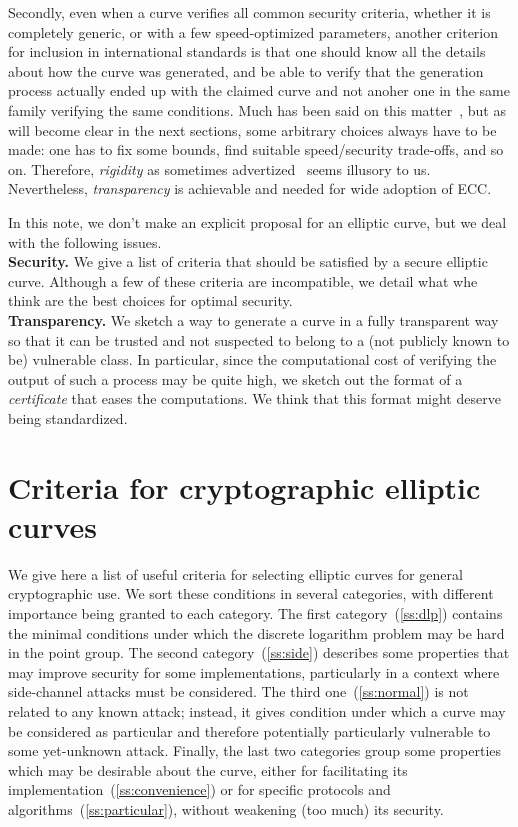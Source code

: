 \documentclass[twocolumn,letterpaper,10pt]{article}
\begin{document}
\medskip
Secondly, even when a curve verifies all common security criteria,
whether it is completely generic, or with a few speed-optimized parameters,
another criterion for inclusion in international standards is that
one should know all the details about how the curve was generated,
and be able to verify that the
generation process actually ended up with the claimed curve
and not anoher one in the same family verifying the same conditions.
Much has been said on this matter~\cite{safecurves,msr2014bcln,eprint2014brainpool,eprint2013abgr},
but as will become clear in the next sections, some arbitrary choices always have
to be made: one has to fix some bounds,
find suitable speed/security trade-offs, and so on.
Therefore, \emph{rigidity} as sometimes advertized~\cite{safecurves} seems illusory
to us.
Nevertheless, \emph{transparency} is achievable and needed for wide adoption of ECC.

\medskip

In this note, we don't make an explicit proposal for an elliptic curve,
but we deal with the following issues.
\\{\bf Security. }
We give a list of criteria that should be satisfied by
a secure elliptic curve.
Although a few of these criteria are incompatible,
we detail what whe think are the best choices for optimal security.
\\{\bf Transparency. }
We sketch a way to generate a curve in a fully transparent way
so that it can be trusted and not suspected to
belong to a (not publicly known to be) vulnerable class.
In particular, since the computational cost of verifying
the output of such a process may be quite high,
we sketch out the format of a \emph{certificate} that eases the computations.
We think that this format might deserve being standardized.

\section{Criteria for cryptographic elliptic curves}
\label{s:criteria}
We give here a list of useful criteria for selecting elliptic curves
for general cryptographic use.
We sort these conditions in several categories,
with different importance being granted to each category.
The first category~(\ref{ss:dlp}) contains the minimal conditions under which
the discrete logarithm problem may be hard in the point group.
The second category~(\ref{ss:side}) describes some properties that
may improve security for some implementations,
particularly in a context where side-channel attacks must be considered.
The third one~(\ref{ss:normal}) is not related to any known attack;
instead, it gives condition under which a curve may be considered
as particular and therefore potentially particularly vulnerable
to some yet-unknown attack.
Finally, the last two categories group some properties
which may be desirable about the curve,
either for facilitating its implementation~(\ref{ss:convenience})
or for specific protocols and algorithms~(\ref{ss:particular}),
without weakening (too much) its security.
\end{document}
